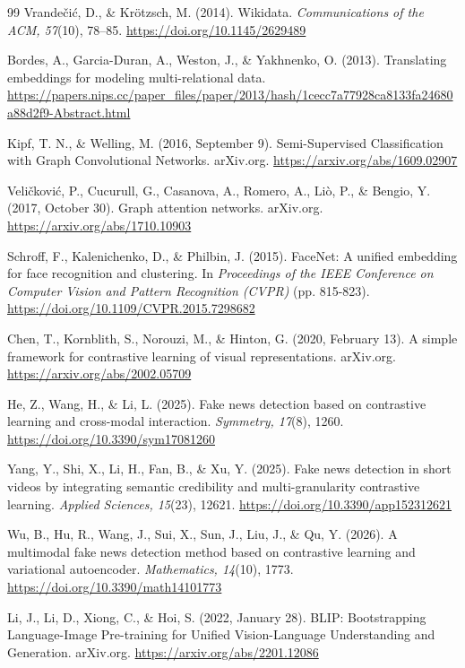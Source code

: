\begin{thebibliography}{99}
Vrande\v{c}i\'{c}, D., \& Kr\"{o}tzsch, M. (2014). Wikidata. \textit{Communications of the ACM, 57}(10), 78--85. \url{https://doi.org/10.1145/2629489}

Bordes, A., Garcia-Duran, A., Weston, J., \& Yakhnenko, O. (2013). Translating embeddings for modeling multi-relational data. \url{https://papers.nips.cc/paper_files/paper/2013/hash/1cecc7a77928ca8133fa24680a88d2f9-Abstract.html}

Kipf, T. N., \& Welling, M. (2016, September 9). Semi-Supervised Classification with Graph Convolutional Networks. arXiv.org. \url{https://arxiv.org/abs/1609.02907}

Veli\v{c}kovi\'{c}, P., Cucurull, G., Casanova, A., Romero, A., Li\`{o}, P., \& Bengio, Y. (2017, October 30). Graph attention networks. arXiv.org. \url{https://arxiv.org/abs/1710.10903}

Schroff, F., Kalenichenko, D., \& Philbin, J. (2015). FaceNet: A unified embedding for face recognition and clustering. In \textit{Proceedings of the IEEE Conference on Computer Vision and Pattern Recognition (CVPR)} (pp. 815-823). \url{https://doi.org/10.1109/CVPR.2015.7298682}

Chen, T., Kornblith, S., Norouzi, M., \& Hinton, G. (2020, February 13). A simple framework for contrastive learning of visual representations. arXiv.org. \url{https://arxiv.org/abs/2002.05709}

He, Z., Wang, H., \& Li, L. (2025). Fake news detection based on contrastive learning and cross-modal interaction. \textit{Symmetry, 17}(8), 1260. \url{https://doi.org/10.3390/sym17081260}

Yang, Y., Shi, X., Li, H., Fan, B., \& Xu, Y. (2025). Fake news detection in short videos by integrating semantic credibility and multi-granularity contrastive learning. \textit{Applied Sciences, 15}(23), 12621. \url{https://doi.org/10.3390/app152312621}

Wu, B., Hu, R., Wang, J., Sui, X., Sun, J., Liu, J., \& Qu, Y. (2026). A multimodal fake news detection method based on contrastive learning and variational autoencoder. \textit{Mathematics, 14}(10), 1773. \url{https://doi.org/10.3390/math14101773}

Li, J., Li, D., Xiong, C., \& Hoi, S. (2022, January 28). BLIP: Bootstrapping Language-Image Pre-training for Unified Vision-Language Understanding and Generation. arXiv.org. \url{https://arxiv.org/abs/2201.12086}


\end{thebibliography}
